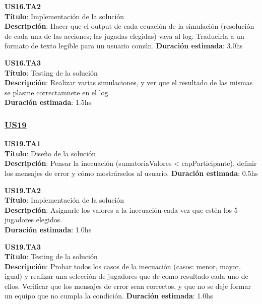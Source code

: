 \begin{tcolorbox}
\textbf{US16.TA2} \\
\textbf{Título}: Implementación de la solución\\
\textbf{Descripción}: Hacer que el output de cada ecuación de la simulación (resolución de cada una de las acciones; las jugadas elegidas) vaya al log. Traducirla a un formato de texto legible para un usuario común.
\textbf{Duración estimada}: 3.0hs
\end{tcolorbox}
\vspace{10pt}

\begin{tcolorbox}
\textbf{US16.TA3} \\
\textbf{Título}: Testing de la solución \\
\textbf{Descripción}: Realizar varias simulaciones, y ver que el resultado de las mismas se plasme correctamnete en el log.\\
\textbf{Duración estimada}: 1.5hs
\end{tcolorbox}
\vspace{10pt}



\subsubsection*{\underline{US19}}

\begin{tcolorbox}
\textbf{US19.TA1} \\
\textbf{Título}:  Diseño de la solución\\
\textbf{Descripción}: Pensar la inecuación (sumatoriaValores < capParticipante), definir los mensajes de error y cómo mostrárselos al usuario. 
\textbf{Duración estimada}: 0.5hs
\end{tcolorbox}
\vspace{10pt}

\begin{tcolorbox}
\textbf{US19.TA2} \\
\textbf{Título}: Implementación de la solución \\
\textbf{Descripción}: Asignarle los valores a la inecuación cada vez que estén los 5 jugadores elegidos. \\
\textbf{Duración estimada}: 1.0hs
\end{tcolorbox}
\vspace{10pt}

\begin{tcolorbox}
\textbf{US19.TA3} \\
\textbf{Título}: Testing de la solución \\
\textbf{Descripción}: Probar todos los casos de la inecuación (casos: menor, mayor, igual) y realizar una selección de jugadores que de como resultado cada uno de ellos. Verificar que los mensajes de error sean correctos, y que no se deje formar un equipo que no cumpla la condición.
\textbf{Duración estimada}: 1.0hs
\end{tcolorbox}
\vspace{10pt}


